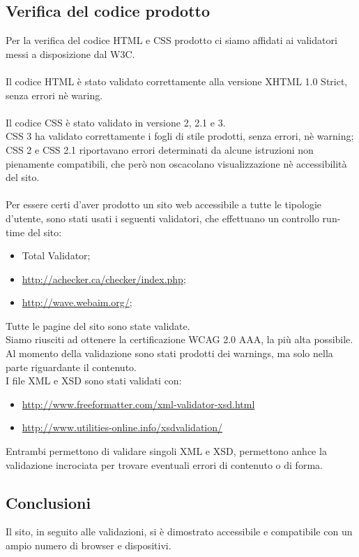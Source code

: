 {	\subsection{Verifica del codice prodotto}{
		Per la verifica del codice HTML e CSS prodotto ci siamo affidati ai validatori messi a disposizione dal W3C.\\
		\\
		Il codice HTML è stato validato correttamente alla versione XHTML 1.0 Strict, senza errori nè waring.\\
		\\
		Il codice CSS è stato validato in versione 2, 2.1 e 3.\\
		CSS 3 ha validato correttamente i fogli di stile prodotti, senza errori, nè warning; CSS 2 e CSS 2.1 riportavano errori determinati da alcune istruzioni non pienamente compatibili, che però non oscacolano visualizzazione nè accessibilità del sito. \\
		\\
		Per essere certi d'aver prodotto un sito web accessibile a tutte le tipologie d'utente, sono stati usati i seguenti validatori, che effettuano un controllo run-time del sito:
		\begin{itemize}\itemsep1pt
			\item Total Validator;
			\item \url{http://achecker.ca/checker/index.php};
			\item \url{http://wave.webaim.org/};
		\end{itemize}
		Tutte le pagine del sito sono state validate.\\
		Siamo riusciti ad ottenere la certificazione WCAG 2.0 AAA, la più alta possibile. Al momento della validazione sono stati prodotti dei warnings, ma solo nella parte riguardante il contenuto.\\
		I file XML e XSD sono stati validati con:
		\begin{itemize}\itemsep1pt
		\item \url{http://www.freeformatter.com/xml-validator-xsd.html}
		\item \url{http://www.utilities-online.info/xsdvalidation/}
		\end{itemize}
		Entrambi permettono di validare singoli XML e XSD, permettono anhce la validazione incrociata per trovare eventuali errori di contenuto o di forma.
	}
	\subsection{Conclusioni}
		Il sito, in seguito alle validazioni, si è dimostrato accessibile e compatibile con un ampio numero di browser e dispositivi.
}